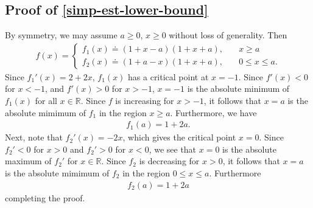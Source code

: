 \documentclass[12pt,reqno]{amsart}
\numberwithin{equation}{section}  %
\numberwithin{figure}{section}
\newcommand{\rr}{\mathbb{R}}
\theoremstyle{plain}
\theoremstyle{definition}
\theoremstyle{remark}
\begin{document}
\subsection{Proof of \eqref{simp-est-lower-bound}}
\label{ssec:simp-est-proof}
By symmetry, we may assume $ a \ge 0$, $x \ge 0$ without loss of generality.
Then
%
%
\begin{equation*}
\begin{split}
f(x) = 
\begin{cases}
  f_{1}(x) \doteq (1 + x-a)(1 + x + a), \quad & x \ge a \\
  f_{2}(x) \doteq (1 + a -x)(1 + x + a), \quad & 0 \le x \le a.
\end{cases}
\end{split}
\end{equation*}
%
%
Since $f_{1}'(x) = 2 + 2x$, $f_{1}(x)$ has a critical point at $x=-1$. Since
$f'(x) < 0$ for $x <-1$, and $f'(x) > 0$ for $x > -1$, $x=-1$ is the absolute
minimum of $f_{1}(x)$ for all $x \in \rr$. Since $f$ is increasing for $x > -1$,
it follows that $x=a$ is the absolute mimimum of $f_{1}$ in the region $x \ge
a$. Furthermore, we have
%
%
\begin{equation*}
\begin{split}
  f_{1}(a) = 1 + 2 a.
\end{split}
\end{equation*}
%
%
Next, note that $f_{2}'(x) = -2x$, which gives the critical point $x = 0$. Since
$f_{2}' < 0$ for $x>0$ and $f_{2}' > 0$ for $x < 0$, we see that $x=0$ is
the absolute maximum of $f_{2}'$ for  $x \in \rr$. Since $f_{2}$ is decreasing
for $x > 0$, it follows that $x = a$
is the absolute mimimum of $f_{2}$ in the region $0 \le x \le a$. Furthermore
%
%
\begin{equation*}
\begin{split}
  f_{2}(a) = 1 + 2 a
\end{split}
\end{equation*}
%
%
completing the proof. \qquad \qedsymbol
%
%


\end{document}

